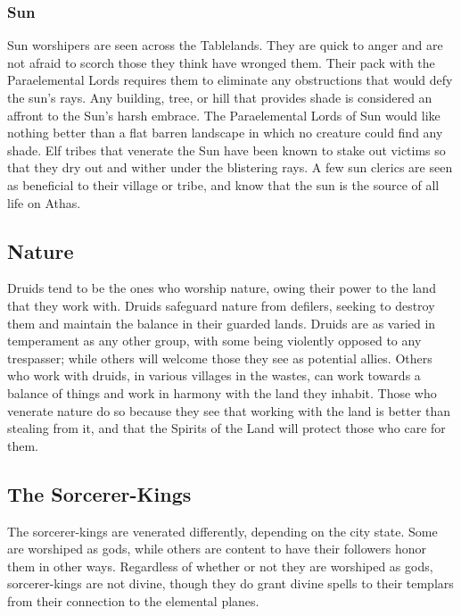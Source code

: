\subsubsection{Sun}
Sun worshipers are seen across the Tablelands. They are quick to anger and are not afraid to scorch those they think have wronged them. Their pack with the Paraelemental Lords requires them to eliminate any obstructions that would defy the sun's rays. Any building, tree, or hill that provides shade is considered an affront to the Sun's harsh embrace. The Paraelemental Lords of Sun would like nothing better than a flat barren landscape in which no creature could find any shade. Elf tribes that venerate the Sun have been known to stake out victims so that they dry out and wither under the blistering rays. A few sun clerics are seen as beneficial to their village or tribe, and know that the sun is the source of all life on Athas.

\subsection{Nature}
Druids tend to be the ones who worship nature, owing their power to the land that they work with. Druids safeguard nature from defilers, seeking to destroy them and maintain the balance in their guarded lands. Druids are as varied in temperament as any other group, with some being violently opposed to any trespasser; while others will welcome those they see as potential allies. Others who work with druids, in various villages in the wastes, can work towards a balance of things and work in harmony with the land they inhabit. Those who venerate nature do so because they see that working with the land is better than stealing from it, and that the Spirits of the Land will protect those who care for them.

\subsection{The Sorcerer-Kings}
The sorcerer-kings are venerated differently, depending on the city state. Some are worshiped as gods, while others are content to have their followers honor them in other ways. Regardless of whether or not they are worshiped as gods, sorcerer-kings are not divine, though they do grant divine spells to their templars from their connection to the elemental planes.


